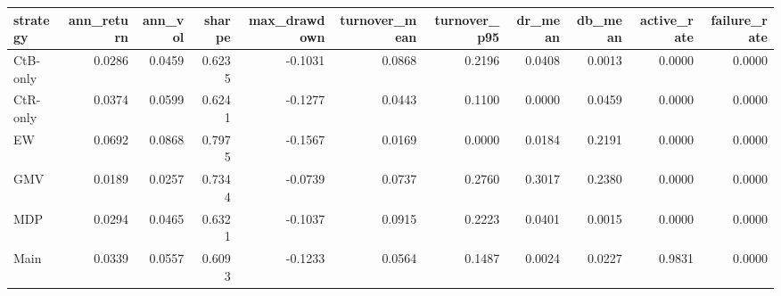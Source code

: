 \begin{tabular}{lrrrrrrrrrr}
\toprule
strategy & ann_return & ann_vol & sharpe & max_drawdown & turnover_mean & turnover_p95 & dr_mean & db_mean & active_rate & failure_rate \\
\midrule
CtB-only & 0.0286 & 0.0459 & 0.6235 & -0.1031 & 0.0868 & 0.2196 & 0.0408 & 0.0013 & 0.0000 & 0.0000 \\
CtR-only & 0.0374 & 0.0599 & 0.6241 & -0.1277 & 0.0443 & 0.1100 & 0.0000 & 0.0459 & 0.0000 & 0.0000 \\
EW & 0.0692 & 0.0868 & 0.7975 & -0.1567 & 0.0169 & 0.0000 & 0.0184 & 0.2191 & 0.0000 & 0.0000 \\
GMV & 0.0189 & 0.0257 & 0.7344 & -0.0739 & 0.0737 & 0.2760 & 0.3017 & 0.2380 & 0.0000 & 0.0000 \\
MDP & 0.0294 & 0.0465 & 0.6321 & -0.1037 & 0.0915 & 0.2223 & 0.0401 & 0.0015 & 0.0000 & 0.0000 \\
Main & 0.0339 & 0.0557 & 0.6093 & -0.1233 & 0.0564 & 0.1487 & 0.0024 & 0.0227 & 0.9831 & 0.0000 \\
\bottomrule
\end{tabular}
